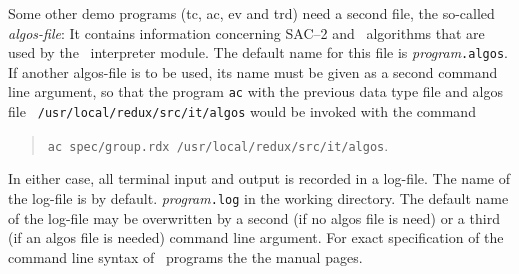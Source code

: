 Some other demo programs (tc, ac, ev and trd) need a second file,
the so-called {\em algos-file\/}: It contains information concerning SAC--2
and \redux\  algorithms that are used by the \redux\  interpreter module.
The default name for this file is {\it program}{\tt .algos}.
If another algos-file is to be used, its name must be given as a
second command line argument, so that the program {\tt ac} with the
previous data type file and algos file {\tt
/usr/local/redux/src/it/algos} would be invoked with the command
\begin{quote}
{\tt ac spec/group.rdx /usr/local/redux/src/it/algos}.
\end{quote}
In either case, all terminal input and output is recorded in a log-file.
The name of the log-file is by default.
{\it program}{\tt .log} in the working directory.
The default name of the log-file may be overwritten by a second 
(if no algos file is need) or a third (if an algos file is needed) command
line argument.
For exact specification of the command line syntax of \redux\ programs
the the manual pages.





